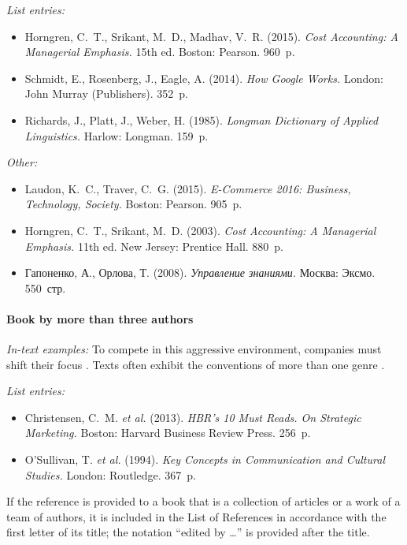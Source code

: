 \emph{List entries:}
\begin{itemize}
  \item Horngren, C.~T., Srikant, M.~D., Madhav, V.~R. (2015). \emph{Cost Accounting: A Managerial Emphasis.} 15th ed. Boston: Pearson. 960~p.
  \item Schmidt, E., Rosenberg, J., Eagle, A. (2014). \emph{How Google Works.} London: John Murray (Publishers). 352~p.
  \item Richards, J., Platt, J., Weber, H. (1985). \emph{Longman Dictionary of Applied Linguistics.} Harlow: Longman. 159~p.
\end{itemize}

\emph{Other:}
\begin{itemize}
  \item Laudon, K.~C., Traver, C.~G. (2015). \emph{E-Commerce 2016: Business, Technology, Society.} Boston: Pearson. 905~p.
  \item Horngren, C.~T., Srikant, M.~D. (2003). \emph{Cost Accounting: A Managerial Emphasis.} 11th ed. New Jersey: Prentice Hall. 880~p.
  \item Гапоненко, А., Орлова, Т. (2008). \emph{Управление знаниями.} Москва: Эксмо. 550~стр.
\end{itemize}

\paragraph{Book by more than three authors}
\emph{In-text examples:} To compete in this aggressive environment, companies must shift their focus \parencite[1]{christensen2013}. Texts often exhibit the conventions of more than one genre \parencite[129]{osullivan1994}.

\emph{List entries:}
\begin{itemize}
  \item Christensen, C.~M. \emph{et al.} (2013). \emph{HBR's 10 Must Reads. On Strategic Marketing.} Boston: Harvard Business Review Press. 256~p.
  \item O'Sullivan, T. \emph{et al.} (1994). \emph{Key Concepts in Communication and Cultural Studies.} London: Routledge. 367~p.
\end{itemize}

If the reference is provided to a book that is a collection of articles or a work of a team of authors, it is included in the List of References in accordance with the first letter of its title; the notation ``edited by \dots'' is provided after the title.

